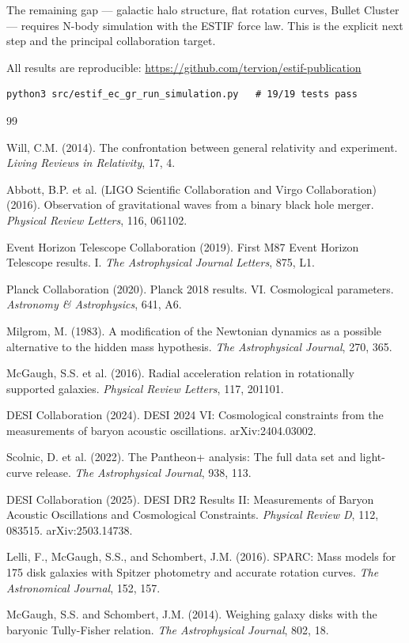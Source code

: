 \documentclass[12pt]{article}
\begin{document}
The remaining gap --- galactic halo structure, flat rotation curves, Bullet Cluster ---
requires N-body simulation with the ESTIF force law. This is the explicit next step
and the principal collaboration target.

All results are reproducible: \url{https://github.com/tervion/estif-publication}

\begin{verbatim}
python3 src/estif_ec_gr_run_simulation.py   # 19/19 tests pass
\end{verbatim}

\begin{thebibliography}{99}

Will, C.M. (2014). The confrontation between general relativity and experiment.
\textit{Living Reviews in Relativity}, 17, 4.

Abbott, B.P. et al. (LIGO Scientific Collaboration and Virgo Collaboration) (2016).
Observation of gravitational waves from a binary black hole merger.
\textit{Physical Review Letters}, 116, 061102.

Event Horizon Telescope Collaboration (2019).
First M87 Event Horizon Telescope results. I.
\textit{The Astrophysical Journal Letters}, 875, L1.

Planck Collaboration (2020).
Planck 2018 results. VI. Cosmological parameters.
\textit{Astronomy \& Astrophysics}, 641, A6.

Milgrom, M. (1983).
A modification of the Newtonian dynamics as a possible alternative to the hidden mass hypothesis.
\textit{The Astrophysical Journal}, 270, 365.

McGaugh, S.S. et al. (2016).
Radial acceleration relation in rotationally supported galaxies.
\textit{Physical Review Letters}, 117, 201101.

DESI Collaboration (2024).
DESI 2024 VI: Cosmological constraints from the measurements of baryon acoustic oscillations.
arXiv:2404.03002.

Scolnic, D. et al. (2022).
The Pantheon+ analysis: The full data set and light-curve release.
\textit{The Astrophysical Journal}, 938, 113.

DESI Collaboration (2025).
DESI DR2 Results II: Measurements of Baryon Acoustic Oscillations and Cosmological Constraints.
\textit{Physical Review D}, 112, 083515.
arXiv:2503.14738.

Lelli, F., McGaugh, S.S., and Schombert, J.M. (2016).
SPARC: Mass models for 175 disk galaxies with Spitzer photometry and accurate rotation curves.
\textit{The Astronomical Journal}, 152, 157.

McGaugh, S.S. and Schombert, J.M. (2014).
Weighing galaxy disks with the baryonic Tully-Fisher relation.
\textit{The Astrophysical Journal}, 802, 18.

\end{thebibliography}
\end{document}
